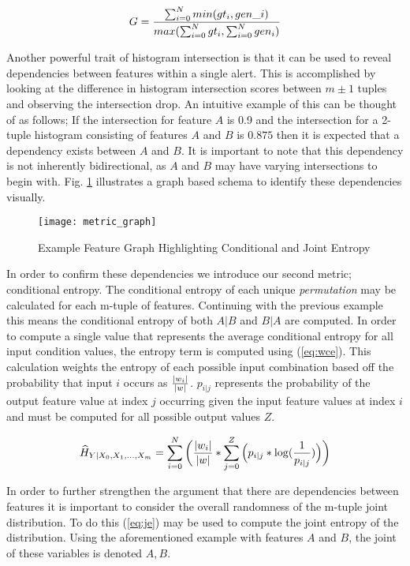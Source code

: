 \begin{equation}
\label{eq:intersection}
G = {{\sum_{i=0}^{N} min(gt_i, gen\_i)} \over {max(\sum_{i=0}^{N} gt_i, \sum_{i=0}^{N} gen_i)}}
\end{equation}

Another powerful trait of histogram intersection is that it can be used to reveal dependencies between features within a single alert. This is accomplished by looking at the difference in histogram intersection scores between $m\pm1$ tuples and observing the intersection drop. An intuitive example of this can be thought of as follows; If the intersection for feature $A$ is 0.9 and the intersection for a 2-tuple histogram consisting of features $A$ and $B$ is $0.875$ then it is expected that a dependency exists between $A$ and $B$. It is important to note that this dependency is not inherently bidirectional, as $A$ and $B$ may have varying intersections to begin with. Fig. \ref{fig:metric_graph} illustrates a graph based schema to identify these dependencies visually. 

\begin{figure}[!htbp]
	\centering%
	\texttt{[image: metric\_graph]}
	\caption{
		Example Feature Graph Highlighting Conditional and Joint Entropy
	}
	\label{fig:metric_graph}
\end{figure}

In order to confirm these dependencies we introduce our second metric; conditional entropy. The conditional entropy of each unique \emph{permutation} may be calculated for each m-tuple of features. Continuing with the previous example this means the conditional entropy of both $A|B$ and $B|A$ are computed. In order to compute a single value that represents the average conditional entropy for all input condition values, the entropy term is computed using (\ref{eq:wce}). This calculation weights the entropy of each possible input combination based off the probability that input $i$ occurs as ${{|w_i|} \over {|w|}}$. ${p_{i|j}}$ represents the probability of the output feature value at index $j$ occurring given the input feature values at index $i$ and must be computed for all possible output values $Z$.

\begin{equation}
\label{eq:wce}
\widehat{H}_{Y|X_0, X_1, ..., X_m} = \sum_{i=0}^{N} \bigg({{|w_i|} \over {|w|}} * {\sum_{j=0}^{Z}\Big({p_{i|j} * \log ({1 \over{p_{i|j}}})}\Big)}\bigg)
\end{equation}

In order to further strengthen the argument that there are dependencies between features it is important to consider the overall randomness of the m-tuple joint distribution. To do this (\ref{eq:je}) may be used to compute the joint entropy of the distribution. Using the aforementioned example with features $A$ and $B$, the joint of these variables is denoted $A,B$.


